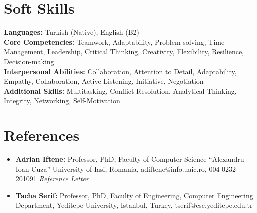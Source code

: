 \documentclass[letterpaper,11pt]{article}
\newcommand{\resumeSubHeadingListStart}{\begin{itemize}[leftmargin=0.15in, label={}]}
\newcommand{\resumeSubHeadingListEnd}{\end{itemize}}
\begin{document}
  \section{Soft Skills}
    \vspace{2pt}
    \resumeSubHeadingListStart
      \small{\item{
          \textbf{Languages:}{ Turkish (Native), English (B2)}  \\ \vspace{3pt}
          \textbf{Core Competencies:}{ Teamwork, Adaptability, Problem-solving, Time Management, Leadership, Critical Thinking, Creativity, Flexibility, Resilience, Decision-making}  \\ \vspace{3pt}
          \textbf{Interpersonal Abilities:}{ Collaboration, Attention to Detail, Adaptability, Empathy, Collaboration, Active Listening, Initiative, Negotiation}  \\ \vspace{3pt}
          \textbf{Additional Skills:}{ Multitasking, Conflict Resolution, Analytical Thinking, Integrity, Networking, Self-Motivation}
      }}
    \resumeSubHeadingListEnd


  \section{References}
    \begin{itemize}
      \item \textbf{Adrian Iftene:} Professor, PhD, Faculty of Computer Science “Alexandru Ioan Cuza” University of Iasi, Romania, adiftene@info.uaic.ro, 004-0232-201091             \emph{\href{https://drive.google.com/file/d/1X6BuxZkUioau63j5d_8L4Fg9YoepFxnk/view?usp=sharing}{\color{blue}Reference Letter}}

    \end{itemize}
        \begin{itemize}
      \item \textbf{Tacha Serif:} Professor, PhD, Faculty of Engineering, Computer Engineering Department, Yeditepe University, Istanbul, Turkey,  tserif@cse.yeditepe.edu.tr
    \end{itemize}
\end{document}

